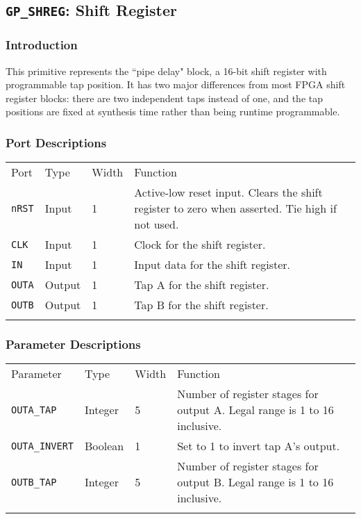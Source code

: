 \documentclass[11pt]{article}
\newcommand{\tokenstyle}[1]{\texttt{#1}}
\newcommand{\whenstyle}[1]{{\fontseries{sb}\selectfont#1}}
\newcommand{\thinhline}{\Xhline{1\arrayrulewidth}}
\newcommand{\thickhline}{\Xhline{2.5\arrayrulewidth}}
\begin{document}
\pagebreak
\clearpage
\subsection{\tokenstyle{GP\_SHREG}: Shift Register}
\label{gp-shreg}

\subsubsection{Introduction}

This primitive represents the ``pipe delay" block, a 16-bit shift register with programmable tap position. It has two
major differences from most FPGA shift register blocks: there are two independent taps instead of one, and the tap
positions are fixed at synthesis time rather than being runtime programmable.

\subsubsection{Port Descriptions}

\begin{tabularx}{\textwidth}{lllX}
\thinhline
\whenstyle{Port} & \whenstyle{Type} & \whenstyle{Width} & \whenstyle{Function} \\
\thickhline
\tokenstyle{nRST} & Input & 1 & Active-low reset input. Clears the shift register to zero when asserted. Tie high if not used.\\
\thinhline
\tokenstyle{CLK} & Input & 1 & Clock for the shift register. \\
\thinhline
\tokenstyle{IN} & Input & 1 & Input data for the shift register. \\
\thinhline
\tokenstyle{OUTA} & Output & 1 & Tap A for the shift register. \\
\thinhline
\tokenstyle{OUTB} & Output & 1 & Tap B for the shift register. \\
\thinhline
\end{tabularx}

\subsubsection{Parameter Descriptions}

\begin{tabularx}{\textwidth}{lllX}
\thinhline
\whenstyle{Parameter} & \whenstyle{Type} & \whenstyle{Width} & \whenstyle{Function} \\
\thickhline
\tokenstyle{OUTA\_TAP} & Integer & 5 & Number of register stages for output A. Legal range is 1 to 16 inclusive.\\
\thinhline
\tokenstyle{OUTA\_INVERT} & Boolean & 1 & Set to 1 to invert tap A's output.\\
\thinhline
\tokenstyle{OUTB\_TAP} & Integer & 5 & Number of register stages for output B. Legal range is 1 to 16 inclusive.\\
\thinhline
\end{tabularx}
\end{document}
